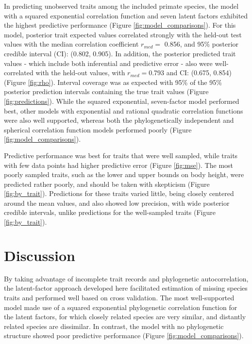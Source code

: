 In predicting unobserved traits among the included primate species, the model with a squared exponential correlation function and seven latent factors exhibited the highest predictive performance (Figure \ref{fig:model_comparisons}).
For this model, posterior trait expected values correlated strongly with the held-out test values with the median correlation coefficient $r_{med} =$ 0.856, and 95\% posterior credible interval (CI): (0.802, 0.905).
In addition, the posterior predicted trait values - which include both inferential and predictive error - also were well-correlated with the held-out values, with $r_{med}=$0.793 and CI: (0.675, 0.854)  (Figure \ref{fig:rho}).
Interval coverage was as expected with 95\% of the 95\% posterior prediction intervals containing the true trait values (Figure \ref{fig:predictions}).
While the squared exponential, seven-factor model performed best, other models with exponential and rational quadratic correlation functions were also well supported, whereas both the phylogenetically independent and spherical correlation function models performed poorly (Figure \ref{fig:model_comparisons}).

Predictive performance was best for traits that were well sampled, while traits with few data points had higher predictive error (Figure \ref{fig:mse}).
The most poorly sampled traits, such as the lower and upper bounds on body height, were predicted rather poorly, and should be taken with skepticism (Figure \ref{fig:by_trait}).
Predictions for these traits varied little, being closely centered around the mean values, and also showed low precision, with wide posterior credible intervals, unlike predictions for the well-sampled traits (Figure \ref{fig:by_trait}).

\section{Discussion}

By taking advantage of incomplete trait records and phylogenetic autocorrelation, the latent-factor approach developed here facilitated estimation of missing species traits and performed well based on cross validation.
The most well-supported model made use of a squared exponential phylogenetic correlation function for the latent factors, for which closely related species are very similar, and distantly related species are dissimilar.
In contrast, the model with no phylogenetic structure showed poor predictive performance (Figure \ref{fig:model_comparisons}).

